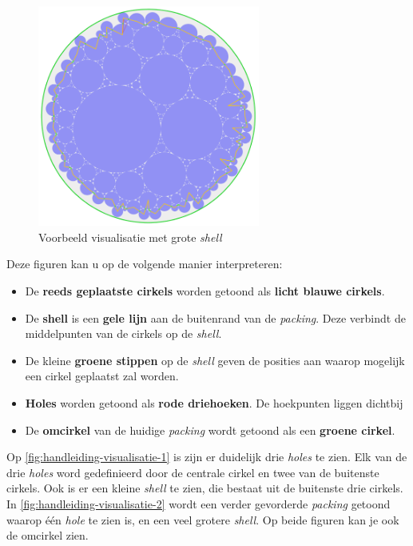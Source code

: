 \documentclass[12pt,a4paper,oneside]{book}
\begin{document}
{\begin{figure}
  \centering
  \includegraphics[width=0.65\textwidth]{handleiding-visualisatie-2.png}
  \caption{Voorbeeld visualisatie met grote \textit{shell}} \label{fig:handleiding-visualisatie-2}
\end{figure}

Deze figuren kan u op de volgende manier interpreteren:

\begin{itemize}  
\item De \textbf{reeds geplaatste cirkels} worden getoond als \textbf{licht blauwe cirkels}.
\item De \textbf{shell} is een \textbf{gele lijn} aan de buitenrand van de \textit{packing}. Deze verbindt de middelpunten van de cirkels op de \textit{shell}.
\item De kleine \textbf{groene stippen} op de \textit{shell} geven de posities aan waarop mogelijk een cirkel geplaatst zal worden.
\item \textbf{Holes} worden getoond als \textbf{rode driehoeken}. De hoekpunten liggen dichtbij %
\item De \textbf{omcirkel} van de huidige \textit{packing} wordt getoond als een \textbf{groene cirkel}.
\end{itemize}

Op \autoref{fig:handleiding-visualisatie-1} is zijn er duidelijk drie \textit{holes} te zien.
Elk van de drie \textit{holes} word gedefinieerd door de centrale cirkel en twee van de buitenste cirkels.
Ook is er een kleine \textit{shell} te zien, die bestaat uit de buitenste drie cirkels.
In \autoref{fig:handleiding-visualisatie-2} wordt een verder gevorderde \textit{packing} getoond waarop één \textit{hole} te zien is, en een veel grotere \textit{shell}.
Op beide figuren kan je ook de omcirkel zien.

}
\end{document}
